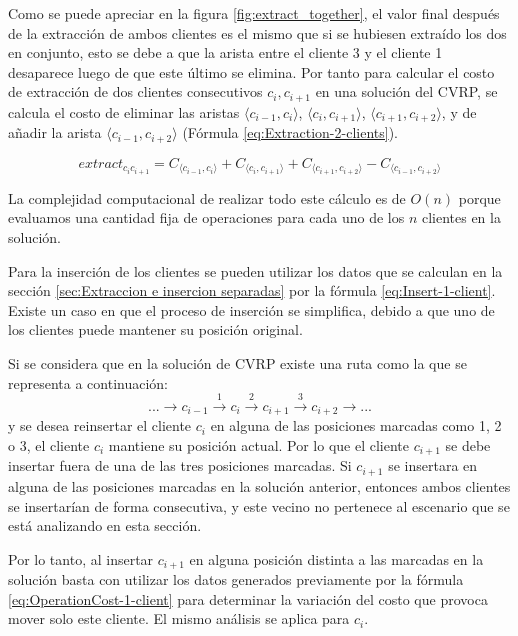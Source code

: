 \documentclass[12pt]{report}
\begin{document}
    Como se puede apreciar en la figura \ref{fig:extract_together}, el valor final después de la extracción de ambos clientes es el mismo que si se hubiesen extraído los dos en conjunto, esto se debe a que la arista entre el cliente 3 y el cliente 1 desaparece luego de que este último se elimina. Por tanto para calcular el costo de extracción de dos clientes consecutivos $c_i,c_{i+1}$ en una solución del CVRP, se calcula el costo de eliminar las aristas $\langle c_{i-1},c_i \rangle$, $\langle c_i,c_{i+1} \rangle$, $\langle c_{i+1},c_{i+2} \rangle$, y de añadir la arista $\langle c_{i-1},c_{i+2} \rangle$ (Fórmula \ref{eq:Extraction-2-clients}).

    \begin{equation}
      	extract_{c_ic_{i+1}} = C_{\langle c_{i-1},c_i \rangle} + C_{\langle c_i,c_{i+1} \rangle} + C_{\langle c_{i+1},c_{i+2} \rangle} - C_{\langle c_{i-1},c_{i+2} \rangle}
      	\label{eq:Extraction-2-clients}
    \end{equation}

    La complejidad computacional de realizar todo este cálculo es de $O(n)$ porque evaluamos una cantidad fija de operaciones para cada uno de los $n$ clientes en la solución.

	Para la inserción de los clientes se pueden utilizar los datos que se calculan en la sección \ref{sec:Extraccion e insercion separadas} por la fórmula \ref{eq:Insert-1-client}. Existe un caso en que el proceso de inserción se simplifica, debido a que uno de los clientes puede mantener su posición original.

	Si se considera que en la solución de CVRP existe una ruta como la que se representa a continuación:
	\[
  ... \rightarrow c_{i-1} \xrightarrow{1} c_i \xrightarrow{2} c_{i+1} \xrightarrow{3} c_{i+2} \rightarrow ...
	\]
	y se desea reinsertar el cliente $c_i$ en alguna de las posiciones marcadas como 1, 2 o 3, el cliente $c_i$ mantiene su posición actual. Por lo que el cliente $c_{i+1}$ se debe insertar fuera de una de las tres posiciones marcadas. Si $c_{i+1}$ se insertara en alguna de las posiciones marcadas en la solución anterior, entonces ambos clientes se insertarían de forma consecutiva, y este vecino no pertenece al escenario que se está analizando en esta sección.

	Por lo tanto, al insertar $c_{i+1}$ en alguna posición distinta a las marcadas en la solución basta con utilizar los datos generados previamente por la fórmula \ref{eq:OperationCost-1-client} para determinar la variación del costo que provoca mover solo este cliente. El mismo análisis se aplica para $c_i$.
\end{document}
